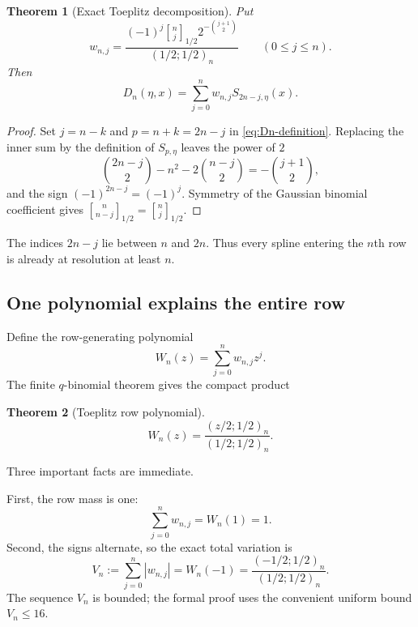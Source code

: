 \documentclass[11pt,oneside]{article}
\newtheorem{theorem}{Theorem}[section]
\theoremstyle{definition}
\theoremstyle{remark}
\newcommand{\poch}[3]{\left(#1;#2\right)_{#3}}
\newcommand{\qbinom}[3]{\genfrac{[}{]}{0pt}{}{#1}{#2}_{#3}}
\begin{document}
\begin{theorem}[Exact Toeplitz decomposition]\label{thm:Toeplitz-decomp}
Put
\begin{equation}\label{eq:wnj-definition}
 w_{n,j}=
 \frac{(-1)^j\qbinom{n}{j}{1/2}
 2^{-\binom{j+1}{2}}}
 {\poch{1/2}{1/2}{n}}
 \qquad(0\le j\le n).
\end{equation}
Then
\begin{equation}\label{eq:Toeplitz-decomp}
 \boxed{
  D_n(\eta,x)=\sum_{j=0}^{n}w_{n,j}S_{2n-j,\eta}(x).}
\end{equation}
\end{theorem}

\begin{proof}
Set $j=n-k$ and $p=n+k=2n-j$ in \eqref{eq:Dn-definition}.  Replacing the
inner sum by the definition of $S_{p,\eta}$ leaves the power of $2$
\[
 \binom{2n-j}{2}-n^2-2\binom{n-j}{2}
 =-\binom{j+1}{2},
\]
and the sign $(-1)^{2n-j}=(-1)^j$.  Symmetry of the Gaussian binomial
coefficient gives
$\qbinom{n}{n-j}{1/2}=\qbinom{n}{j}{1/2}$.
\end{proof}

The indices $2n-j$ lie between $n$ and $2n$.  Thus every spline entering the
$n$th row is already at resolution at least $n$.

\subsection{One polynomial explains the entire row}

Define the row-generating polynomial
\begin{equation}\label{eq:Wn-definition}
  W_n(z)=\sum_{j=0}^{n}w_{n,j}z^j.
\end{equation}
The finite $q$-binomial theorem gives the compact product
\begin{theorem}[Toeplitz row polynomial]\label{thm:row-polynomial}
\begin{equation}\label{eq:row-polynomial}
 \boxed{
 W_n(z)=\frac{\poch{z/2}{1/2}{n}}
              {\poch{1/2}{1/2}{n}}.}
\end{equation}
\end{theorem}

Three important facts are immediate.

First, the row mass is one:
\begin{equation}\label{eq:row-mass}
 \sum_{j=0}^{n}w_{n,j}=W_n(1)=1.
\end{equation}
Second, the signs alternate, so the exact total variation is
\begin{equation}\label{eq:row-TV}
 V_n:=\sum_{j=0}^{n}|w_{n,j}|
 =W_n(-1)
 =\frac{\poch{-1/2}{1/2}{n}}
        {\poch{1/2}{1/2}{n}}.
\end{equation}
The sequence $V_n$ is bounded; the formal proof uses the convenient uniform
bound $V_n\le16$.
\end{document}
